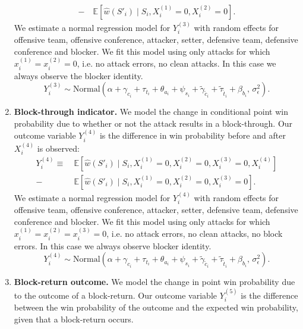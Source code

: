 \documentclass[USenglish]{article}
\theoremstyle{dgthm}
\theoremstyle{dgdef}
\begin{document}
\begin{enumerate}
\begin{align*}
            - &~\mathbb{E}\left[\hat w(S'_i) \mid S_i, X_i^{(1)} = 0, X_i^{(2)} = 0\right].
        \end{align*}
        We estimate a normal regression model for $Y_i^{(3)}$ with random effects for offensive team, offensive conference, attacker, setter, defensive team, defensive conference and blocker. We fit this model using only attacks for which $x_i^{(1)} = x_i^{(2)} = 0$, i.e. no attack errors, no clean attacks. In this case we always observe the blocker identity.
        \begin{equation}
        \label{eqn:attack-model-3}
            Y_i^{(3)} \sim \mbox{Normal}\left(
                \alpha + \gamma_{c_i} + \tau_{t_i} + \theta_{a_i} + \psi_{s_i} + \tilde\gamma_{\tilde c_i} + \tilde\tau_{\tilde t_i} + \beta_{b_i},\,
                \sigma^2_\epsilon
            \right).
        \end{equation}
    \item
        {\bf Block-through indicator.} We model the change in conditional point win probability due to whether or not the attack results in a block-through. Our outcome variable $Y_i^{(4)}$ is the difference in win probability before and after $X_i^{(4)}$ is observed:
        \begin{align*}
            Y_i^{(4)} \equiv &~\mathbb{E}\left[\hat w(S'_i) \mid S_i, X_i^{(1)} = 0, X_i^{(2)} = 0, X_i^{(3)} = 0, X_i^{(4)}\right]\\
            - &~\mathbb{E}\left[\hat w(S'_i) \mid S_i, X_i^{(1)} = 0, X_i^{(2)} = 0, X_i^{(3)} = 0\right].
        \end{align*}
        We estimate a normal regression model for $Y_i^{(4)}$ with random effects for offensive team, offensive conference, attacker, setter, defensive team, defensive conference and blocker. We fit this model using only attacks for which $x_i^{(1)} = x_i^{(2)} = x_i^{(3)} = 0$, i.e. no attack errors, no clean attacks, no block errors. In this case we always observe blocker identity.
        \begin{equation}
        \label{eqn:attack-model-4}
            Y_i^{(4)} \sim \mbox{Normal}\left(
                \alpha + \gamma_{c_i} + \tau_{t_i} + \theta_{a_i} + \psi_{s_i} + \tilde\gamma_{\tilde c_i} + \tilde\tau_{\tilde t_i} + \beta_{b_i},\,
                \sigma^2_\epsilon
            \right).
        \end{equation}
    \item
        {\bf Block-return outcome.} We model the change in point win probability due to the outcome of a block-return. Our outcome variable $Y_i^{(5)}$ is the difference between the win probability of the outcome and the expected win probability, given that a block-return occurs.

\end{enumerate}
\end{document}
